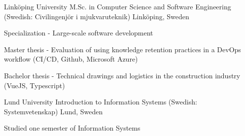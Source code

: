 
\begin{cventries}

\cventry
    {Linköping University} %
    {M.Sc. in Computer Science and Software Engineering (Swedish: Civilingenjör i mjukvaruteknik)} %
    {Linköping, Sweden} %
    {} %
    {
      \begin{cvitems} %
        \item {Specialization - Large-scale software development}
        \item {Master thesis - Evaluation of using knowledge retention practices in a DevOps workflow (CI/CD, Github, Microsoft Azure)}
        \item {Bachelor thesis - Technical drawings and logistics in the construction industry (VueJS, Typescript)}
      \end{cvitems}
    }

\cventry
    {Lund University} %
    {Introduction to Information Systems (Swedish: Systemvetenskap)} %
    {Lund, Sweden} %
    {} %
    {
      \begin{cvitems} %
        \item {Studied one semester of Information Systems}
      \end{cvitems}
    }
\end{cventries}
